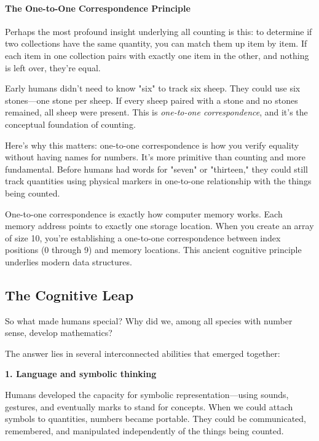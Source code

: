 \paragraph{The One-to-One Correspondence Principle}
Perhaps the most profound insight underlying all counting is this: to determine if two collections have the same quantity, you can match them up item by item. If each item in one collection pairs with exactly one item in the other, and nothing is left over, they're equal.

Early humans didn't need to know "six" to track six sheep. They could use six stones—one stone per sheep. If every sheep paired with a stone and no stones remained, all sheep were present. This is \textit{one-to-one correspondence}, and it's the conceptual foundation of counting.

Here's why this matters: one-to-one correspondence is how you verify equality without having names for numbers. It's more primitive than counting and more fundamental. Before humans had words for "seven" or "thirteen," they could still track quantities using physical markers in one-to-one relationship with the things being counted.

\begin{connection}
	One-to-one correspondence is exactly how computer memory works. Each memory address points to exactly one storage location. When you create an array of size 10, you're establishing a one-to-one correspondence between index positions (0 through 9) and memory locations. This ancient cognitive principle underlies modern data structures.
\end{connection}

\subsection{The Cognitive Leap}

So what made humans special? Why did we, among all species with number sense, develop mathematics?

The answer lies in several interconnected abilities that emerged together:

\textbf{1. Language and symbolic thinking}

Humans developed the capacity for symbolic representation—using sounds, gestures, and eventually marks to stand for concepts. When we could attach symbols to quantities, numbers became portable. They could be communicated, remembered, and manipulated independently of the things being counted.

